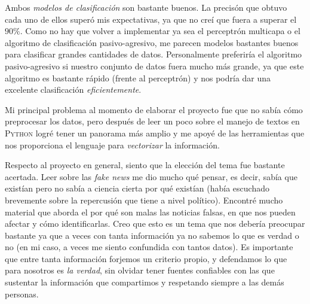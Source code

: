 \documentclass[letterpaper,11pt]{article}
\begin{document}
Ambos \textit{modelos de clasificación} son bastante buenos. La precisón que 
obtuvo cada uno de ellos superó mis expectativas, ya que no creí que fuera a 
superar el $90\%$. Como no hay que volver a implementar ya sea el perceptrón 
multicapa o el algoritmo de clasificación pasivo-agresivo, me parecen modelos 
bastantes buenos para clasificar grandes cantidades de datos. Personalmente
preferiría el algoritmo pasivo-agresivo si nuestro conjunto de datos fuera 
mucho más grande, ya que este algoritmo es bastante rápido (frente al 
perceptrón) y nos podría dar una excelente clasificación \textit{eficientemente}.

Mi principal problema al momento de elaborar el proyecto fue que no sabía cómo 
preprocesar los datos, pero después de leer un poco sobre el manejo de textos
en \textsc{Python} logré tener un panorama más amplio y me apoyé de las 
herramientas que nos proporciona el lenguaje para \textit{vectorizar} la 
información.

Respecto al proyecto en general, siento que la elección del tema fue bastante 
acertada. Leer sobre las \textit{fake news} me dio mucho qué pensar, es decir, 
sabía que existían pero no sabía a ciencia cierta por qué existían (había 
escuchado brevemente sobre la repercusión que tiene a nivel político). Encontré
 mucho material que aborda el por qué son malas las noticias falsas, en que nos 
pueden afectar y cómo identificarlas. Creo que esto es un tema que nos debería 
preocupar bastante ya que a veces con tanta información ya no sabemos lo que es 
verdad o no (en mi caso, a veces me siento confundida con tantos datos). Es 
importante que entre tanta información forjemos un criterio propio, y defendamos 
lo que para nosotros es \textit{la verdad}, sin olvidar tener fuentes confiables 
con las que sustentar la información que compartimos y respetando siempre a las 
demás personas. 
\end{document}
